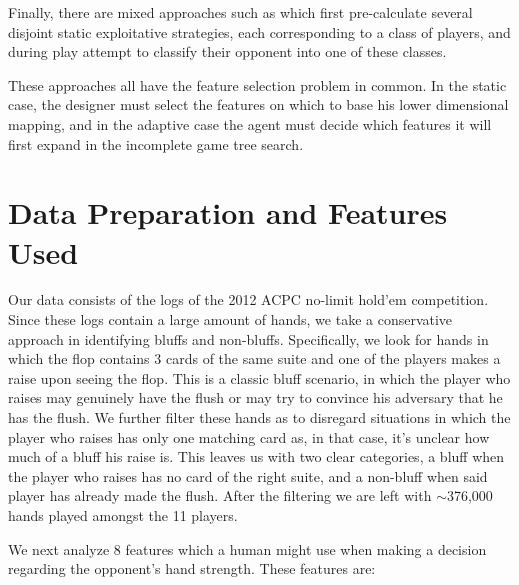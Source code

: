 \documentclass[letterpaper]{article}
\begin{document}
Finally, there are mixed approaches such as  \cite{P10} which first pre-calculate several disjoint static exploitative strategies, each corresponding to a class of players, and during play attempt to classify their opponent into one of these classes.

These approaches all have the feature selection problem in common. In the static case, the designer must select the features on which to base his lower dimensional mapping, and in the adaptive case the agent must decide which features it will first expand in the incomplete game tree search.

\section{
\fontsize{12pt}{15pt} 
\selectfont
Data Preparation and Features Used}
\fontsize{10pt}{12pt} 
\selectfont
Our data consists of the logs of the 2012 ACPC no-limit hold'em competition. Since these logs contain a large amount of hands, we take a conservative approach in identifying bluffs and non-bluffs. Specifically, we look for hands in which the flop contains 3 cards of the same suite and one of the players makes a raise upon seeing the flop. This is a classic bluff scenario, in which the player who raises may genuinely have the flush or may try to convince his adversary that he has the flush. We further filter these hands as to disregard situations in which the player who raises has only one matching card as, in that case, it's unclear how much of a bluff his raise is. This leaves us with two clear categories, a bluff when the player who raises has no card of the right suite, and a non-bluff when said player has already made the flush. After the filtering we are left with $\sim$376,000 hands played amongst the 11 players.

We next analyze 8 features which a human might use when making a decision regarding the opponent's hand strength. These features are:
\end{document}
